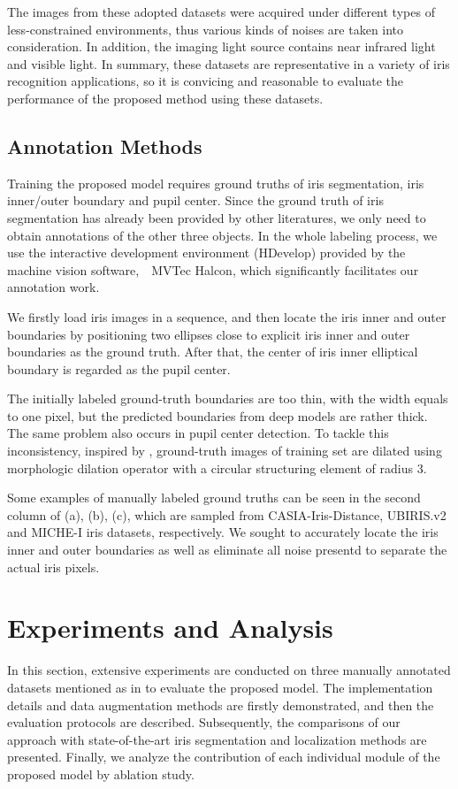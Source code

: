 \documentclass[journal]{IEEEtran}
\begin{document}
The images from these adopted datasets were acquired under different types of less-constrained environments, thus various kinds of noises are taken into consideration. In addition, the imaging light source contains near infrared light and visible light. In summary, these datasets are representative in a variety of iris recognition applications, so it is convicing and reasonable to evaluate the performance of the proposed method using these datasets.


\subsection{Annotation Methods} \label{sec:anno}
Training the proposed model requires ground truths of iris segmentation, iris inner/outer boundary and pupil center.
Since the ground truth of iris segmentation has already been provided by other literatures, we only need to obtain annotations of the other three objects.
In the whole labeling process, we use the interactive development environment (HDevelop) provided by the machine vision software,~\ie~MVTec Halcon\cite{halcon201211}, which significantly facilitates our annotation work.

We firstly load iris images in a sequence, and then locate the iris inner and outer boundaries by positioning two ellipses close to explicit iris inner and outer boundaries as the ground truth. After that, the center of iris inner elliptical boundary is regarded as the pupil center.

The initially labeled ground-truth boundaries are too thin, with the width equals to one pixel, but the predicted boundaries from deep models are rather thick. The same problem also occurs in pupil center detection. To tackle this inconsistency, inspired by \cite{liu2016learning}, ground-truth images of training set are dilated using morphologic dilation operator with a circular structuring element of radius 3.

Some examples of manually labeled ground truths can be seen in the second column of  (a), (b), (c), which are sampled from CASIA-Iris-Distance, UBIRIS.v2 and MICHE-I iris datasets, respectively. We sought to accurately locate the iris inner and outer boundaries as well as
eliminate all noise presentd to separate the actual iris pixels.


\section{Experiments and Analysis}
In this section, extensive experiments are conducted on three manually annotated datasets mentioned as in  to evaluate the proposed model.
The implementation details and data augmentation methods are firstly demonstrated, and then the evaluation protocols are described.
Subsequently, the comparisons of our approach with state-of-the-art iris segmentation and localization methods are presented.
Finally, we analyze the contribution of each individual module of the proposed model by ablation study.
\end{document}
